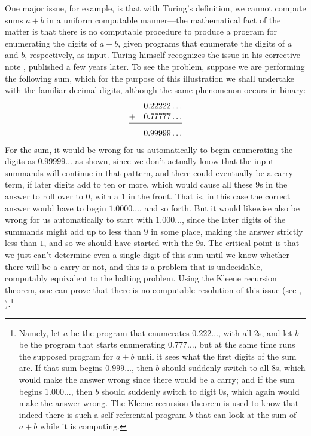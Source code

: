 \documentclass{amsart}
\begin{document}
One major issue, for example, is that with Turing's definition, we cannot compute sums $a+b$ in a uniform computable manner---the mathematical fact of the matter is that there is no computable procedure to produce a program for enumerating the digits of $a+b$, given programs that enumerate the digits of $a$ and $b$, respectively, as input. Turing himself recognizes the issue in his corrective note \cite{Turing1938:On-computable-numbers-a-correction}, published a few years later. To see the problem, suppose we are performing the following sum, which for the purpose of this illustration we shall undertake with the familiar decimal digits, although the same phenomenon occurs in binary:
\begin{align*}
        &0.22222\ldots \\[-2pt]
 +\quad &0.77777\ldots \\[-10pt]
   \cline{1-2}
        &0.99999\ldots
\end{align*}
For the sum, it would be wrong for us automatically to begin enumerating the digits as $0.99999\ldots$ as shown, since we don't actually know that the input summands will continue in that pattern, and there could eventually be a carry term, if later digits add to ten or more, which would cause all these $9$s in the answer to roll over to $0$, with a $1$ in the front. That is, in this case the correct answer would have to begin $1.0000\ldots$, and so forth. But it would likewise also be wrong for us automatically to start with $1.000\ldots$, since the later digits of the summands might add up to less than $9$ in some place, making the answer strictly less than $1$, and so we should have started with the $9$s. The critical point is that we just can't determine even a single digit of this sum until we know whether there will be a carry or not, and this is a problem that is undecidable, computably equivalent to the halting problem. Using the Kleene recursion theorem, one can prove that there is no computable resolution of this issue (see \cite{Hamkins.blog2018:Alan-Turing-on-computable-numbers}, \cite[\S6.6]{Hamkins2021:Lectures-on-the-philosophy-of-mathematics}).\footnote{Namely, let $a$ be the program that enumerates $0.222\ldots$, with all $2$s, and let $b$ be the program that starts enumerating $0.777\ldots$, but at the same time runs the supposed program for $a+b$ until it sees what the first digits of the sum are. If that sum begins $0.999\ldots$, then $b$ should suddenly switch to all $8$s, which would make the answer wrong since there would be a carry; and if the sum begins $1.000\ldots$, then $b$ should suddenly switch to digit $0$s, which again would make the answer wrong. The Kleene recursion theorem is used to know that indeed there is such a self-referential program $b$ that can look at the sum of $a+b$ while it is computing.}
\end{document}
